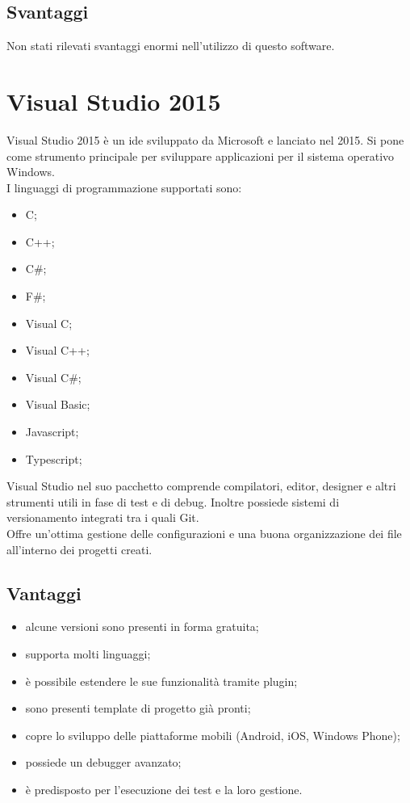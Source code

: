 \subsection*{Svantaggi}
Non stati rilevati svantaggi enormi nell'utilizzo di questo software.
\section{Visual Studio 2015}
Visual Studio 2015 è un \gls{ide} sviluppato da Microsoft e lanciato nel 2015. Si pone come strumento principale per sviluppare applicazioni per il sistema operativo Windows.\\ 
I linguaggi di programmazione supportati sono:
\begin{itemize}
	\item C;
	\item C++;
	\item C\#;
	\item F\#;
	\item Visual C;
	\item Visual C++;
	\item Visual C\#;
	\item Visual Basic;
	\item Javascript;
	\item Typescript;
\end{itemize}
Visual Studio nel suo pacchetto comprende compilatori, editor, designer e altri strumenti utili in fase di test e di debug. Inoltre possiede sistemi di versionamento integrati tra i quali Git.\\
Offre un'ottima gestione delle configurazioni e una buona organizzazione dei file all'interno dei progetti creati.
\subsection*{Vantaggi}
\begin{itemize}
	\item alcune versioni sono presenti in forma gratuita;
	\item supporta molti linguaggi;
	\item è possibile estendere le sue funzionalità tramite plugin;
	\item sono presenti template di progetto già pronti;
	\item copre lo sviluppo delle piattaforme mobili (Android, iOS, Windows Phone);
	\item possiede un debugger avanzato;
	\item è predisposto per l'esecuzione dei test e la loro gestione.
\end{itemize}

